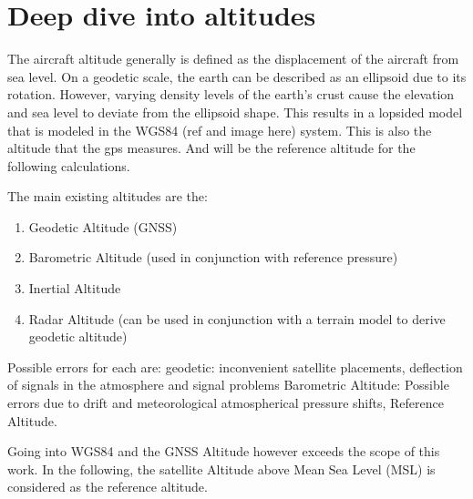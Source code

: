 \section{Deep dive into altitudes}

The aircraft altitude generally is defined as the displacement of the aircraft from sea level.
On a geodetic scale, the earth can be described as an ellipsoid due to its rotation. However, varying density levels of the earth's crust cause the elevation and sea level to deviate from the ellipsoid shape. This results in a lopsided model that is modeled in the WGS84 (ref and image here) system. This is also the altitude that the gps measures. And will be the reference altitude for the following calculations.

The main existing altitudes are the:
\begin{enumerate}
    \item Geodetic Altitude (GNSS)
    \item Barometric Altitude (used in conjunction with reference pressure)
    \item Inertial Altitude
    \item Radar Altitude (can be used in conjunction with a terrain model to derive geodetic altitude)
\end{enumerate}
Possible errors for each are:
geodetic: inconvenient satellite placements, deflection of signals in the atmosphere and signal problems
Barometric Altitude: Possible errors due to drift and meteorological atmospherical pressure shifts, Reference Altitude.

Going into WGS84 and the GNSS Altitude however exceeds the scope of this work. In the following, the satellite Altitude above Mean Sea Level (MSL) is considered as the reference altitude.